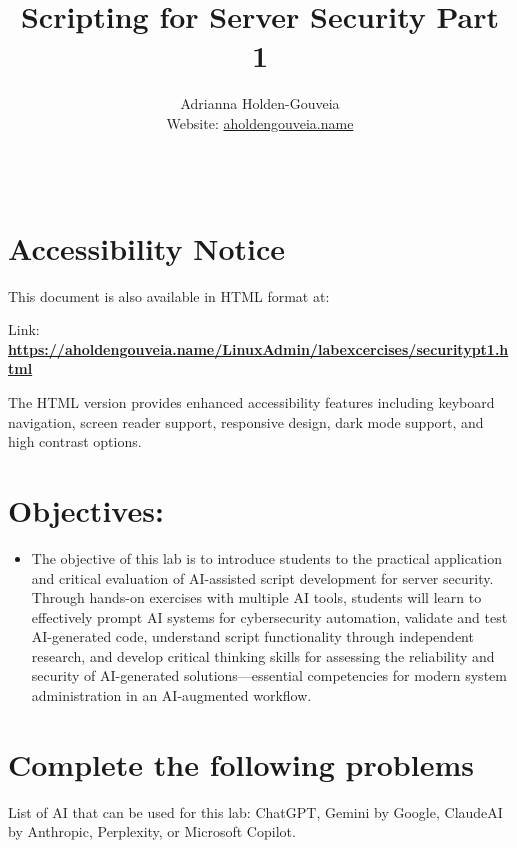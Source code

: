 \documentclass[12pt]{article}
\title{Scripting for Server Security Part 1}
\author{
        Adrianna Holden-Gouveia \\
        Website: \href{https://aholdengouveia.name}{aholdengouveia.name}\\ 
        \date{\vspace{-5ex}}
        \faGithub {: aholdengouveia} \\
        }
\begin{document}
    

\maketitle




\section*{Accessibility Notice}
This document is also available in HTML format at:

Link: \href{https://aholdengouveia.name/LinuxAdmin/labexcercises/securitypt1.html}{\textbf{https://aholdengouveia.name/LinuxAdmin/labexcercises/securitypt1.html}}

The HTML version provides enhanced accessibility features including keyboard navigation, screen reader support, responsive design, dark mode support, and high contrast options.

\section*{Objectives:}
\begin{itemize}
    \item The objective of this lab is to introduce students to the practical application and critical evaluation of AI-assisted script development for server security. Through hands-on exercises with multiple AI tools, students will learn to effectively prompt AI systems for cybersecurity automation, validate and test AI-generated code, understand script functionality through independent research, and develop critical thinking skills for assessing the reliability and security of AI-generated solutions—essential competencies for modern system administration in an AI-augmented workflow.
\end{itemize}
\section*{Complete the following problems}


List of AI that can be used for this lab:  ChatGPT, Gemini by Google, ClaudeAI by Anthropic, Perplexity, or Microsoft Copilot. 
\end{document}
